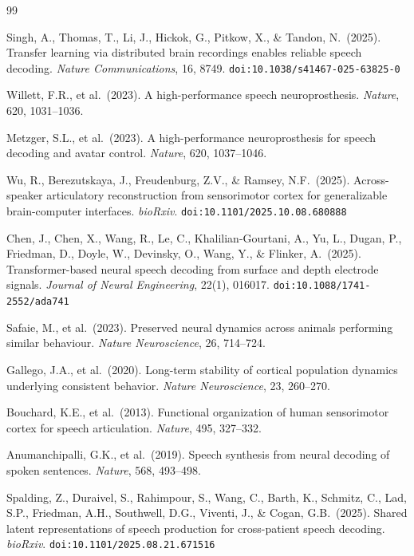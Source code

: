 \documentclass[11pt,letterpaper]{article}
\begin{document}
\begin{thebibliography}{99}\raggedright

Singh, A., Thomas, T., Li, J., Hickok, G., Pitkow, X., \& Tandon, N.\ (2025).
Transfer learning via distributed brain recordings enables reliable speech decoding.
\textit{Nature Communications}, 16, 8749.
\texttt{doi:10.1038/s41467-025-63825-0}

Willett, F.R., et al.\ (2023).
A high-performance speech neuroprosthesis.
\textit{Nature}, 620, 1031--1036.

Metzger, S.L., et al.\ (2023).
A high-performance neuroprosthesis for speech decoding and avatar control.
\textit{Nature}, 620, 1037--1046.

Wu, R., Berezutskaya, J., Freudenburg, Z.V., \& Ramsey, N.F.\ (2025).
Across-speaker articulatory reconstruction from sensorimotor cortex for generalizable brain-computer interfaces.
\textit{bioRxiv}.
\texttt{doi:10.1101/2025.10.08.680888}

Chen, J., Chen, X., Wang, R., Le, C., Khalilian-Gourtani, A., Yu, L., Dugan, P., Friedman, D., Doyle, W., Devinsky, O., Wang, Y., \& Flinker, A.\ (2025).
Transformer-based neural speech decoding from surface and depth electrode signals.
\textit{Journal of Neural Engineering}, 22(1), 016017.
\texttt{doi:10.1088/1741-2552/ada741}

Safaie, M., et al.\ (2023).
Preserved neural dynamics across animals performing similar behaviour.
\textit{Nature Neuroscience}, 26, 714--724.

Gallego, J.A., et al.\ (2020).
Long-term stability of cortical population dynamics underlying consistent behavior.
\textit{Nature Neuroscience}, 23, 260--270.

Bouchard, K.E., et al.\ (2013).
Functional organization of human sensorimotor cortex for speech articulation.
\textit{Nature}, 495, 327--332.

Anumanchipalli, G.K., et al.\ (2019).
Speech synthesis from neural decoding of spoken sentences.
\textit{Nature}, 568, 493--498.

Spalding, Z., Duraivel, S., Rahimpour, S., Wang, C., Barth, K., Schmitz, C., Lad, S.P., Friedman, A.H., Southwell, D.G., Viventi, J., \& Cogan, G.B.\ (2025).
Shared latent representations of speech production for cross-patient speech decoding.
\textit{bioRxiv}.
\texttt{doi:10.1101/2025.08.21.671516}


\end{thebibliography}
\end{document}
